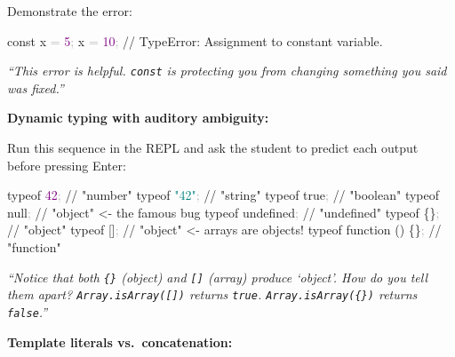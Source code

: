 \documentclass[
  justified,
  openright,
]{tufte-book}
\newcommand{\CommentTok}[1]{\textcolor{MidGray}{#1}}
\newcommand{\DecValTok}[1]{\textcolor{Purple}{#1}}
\newcommand{\KeywordTok}[1]{\textcolor{BrandBlue}{#1}}
\newcommand{\NormalTok}[1]{#1}
\newcommand{\OperatorTok}[1]{\textcolor{DarkGray}{#1}}
\newcommand{\StringTok}[1]{\textcolor{Teal}{#1}}
\newenvironment{Shaded}{%
  \begin{snugshade}
}{%
  \end{snugshade}
}
\begin{document}
Demonstrate the error:

\begin{Shaded}
\begin{Highlighting}[]
\KeywordTok{const}\NormalTok{ x }\OperatorTok{=} \DecValTok{5}\OperatorTok{;}
\NormalTok{x }\OperatorTok{=} \DecValTok{10}\OperatorTok{;} \CommentTok{// TypeError: Assignment to constant variable.}
\end{Highlighting}
\end{Shaded}

\emph{``This error is helpful. \texttt{const} is protecting you from
changing something you said was fixed.''}

\textbf{Dynamic typing with auditory ambiguity:}

Run this sequence in the REPL and ask the student to predict each output
before pressing Enter:

\begin{Shaded}
\begin{Highlighting}[]
\KeywordTok{typeof} \DecValTok{42}\OperatorTok{;} \CommentTok{// "number"}
\KeywordTok{typeof} \StringTok{"42"}\OperatorTok{;} \CommentTok{// "string"}
\KeywordTok{typeof} \KeywordTok{true}\OperatorTok{;} \CommentTok{// "boolean"}
\KeywordTok{typeof} \KeywordTok{null}\OperatorTok{;} \CommentTok{// "object"  \textless{}{-} the famous bug}
\KeywordTok{typeof} \KeywordTok{undefined}\OperatorTok{;} \CommentTok{// "undefined"}
\KeywordTok{typeof}\NormalTok{ \{\}}\OperatorTok{;} \CommentTok{// "object"}
\KeywordTok{typeof}\NormalTok{ []}\OperatorTok{;} \CommentTok{// "object"  \textless{}{-} arrays are objects!}
\KeywordTok{typeof} \KeywordTok{function}\NormalTok{ () \{\}}\OperatorTok{;} \CommentTok{// "function"}
\end{Highlighting}
\end{Shaded}

\emph{``Notice that both \texttt{\{\}} (object) and \texttt{{[}{]}}
(array) produce `object'. How do you tell them apart?
\texttt{Array.isArray({[}{]})} returns \texttt{true}.
\texttt{Array.isArray(\{\})} returns \texttt{false}.''}

\textbf{Template literals vs.~concatenation:}
\end{document}
